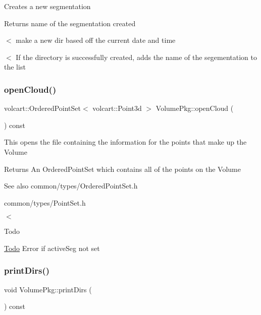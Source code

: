 Creates a new segmentation \begin{DoxyReturn}{Returns}
name of the segmentation created 
\end{DoxyReturn}
$<$ make a new dir based off the current date and time

$<$ If the directory is successfully created, adds the name of the segementation to the list \hypertarget{classVolumePkg_a93ab30fd1648cda039edff14b25f2d8b}{}\label{classVolumePkg_a93ab30fd1648cda039edff14b25f2d8b} 
\subsubsection{\texorpdfstring{open\+Cloud()}{openCloud()}}
{\footnotesize\ttfamily volcart\+::\+Ordered\+Point\+Set$<$ volcart\+::\+Point3d $>$ Volume\+Pkg\+::open\+Cloud (\begin{DoxyParamCaption}{ }\end{DoxyParamCaption}) const}

This opens the file containing the information for the points that make up the Volume \begin{DoxyReturn}{Returns}
An Ordered\+Point\+Set which contains all of the points on the Volume 
\end{DoxyReturn}
\begin{DoxySeeAlso}{See also}
common/types/\+Ordered\+Point\+Set.\+h 

common/types/\+Point\+Set.\+h 
\end{DoxySeeAlso}
$<$\begin{DoxyRefDesc}{Todo}
\item[\hyperlink{todo__todo000002}{Todo}]Error if active\+Seg not set \end{DoxyRefDesc}
\hypertarget{classVolumePkg_a3489e485f40be9bdcb4b993b6aaccc2d}{}\label{classVolumePkg_a3489e485f40be9bdcb4b993b6aaccc2d} 
\subsubsection{\texorpdfstring{print\+Dirs()}{printDirs()}}
{\footnotesize\ttfamily void Volume\+Pkg\+::print\+Dirs (\begin{DoxyParamCaption}{ }\end{DoxyParamCaption}) const\hspace{0.3cm}{\ttfamily [inline]}}

